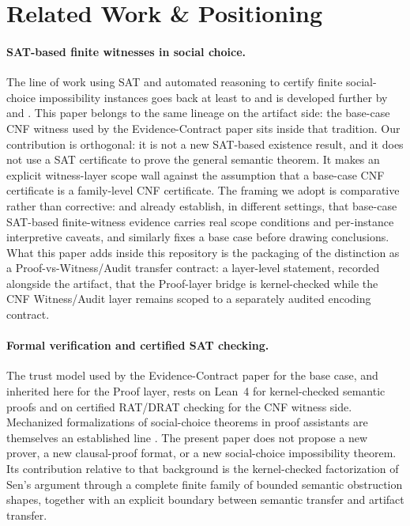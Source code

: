 \section{Related Work \& Positioning}
\label{sec:related}

\paragraph{SAT-based finite witnesses in social choice.}
The line of work using SAT and automated reasoning to certify finite social-choice impossibility instances goes back at least to \citet{tanglin2009computer} and is developed further by \citet{geist2011automated} and \citet{brandtgeist2016strategyproof}.
This paper belongs to the same lineage on the artifact side: the base-case CNF witness used by the Evidence-Contract paper sits inside that tradition.
Our contribution is orthogonal: it is not a new SAT-based existence result, and it does not use a SAT certificate to prove the general semantic theorem.
It makes an explicit witness-layer scope wall against the assumption that a base-case CNF certificate is a family-level CNF certificate.
The framing we adopt is comparative rather than corrective: \citet{tanglin2009computer} and \citet{geist2011automated} already establish, in different settings, that base-case SAT-based finite-witness evidence carries real scope conditions and per-instance interpretive caveats, and \citet{brandtgeist2016strategyproof} similarly fixes a base case before drawing conclusions.
What this paper adds inside this repository is the packaging of the distinction as a Proof-vs-Witness/Audit transfer contract: a layer-level statement, recorded alongside the artifact, that the Proof-layer bridge is kernel-checked while the CNF Witness/Audit layer remains scoped to a separately audited encoding contract.

\paragraph{Formal verification and certified SAT checking.}
The trust model used by the Evidence-Contract paper for the base case, and inherited here for the Proof layer, rests on Lean~4 \citep{moura2021lean4} for kernel-checked semantic proofs and on certified RAT/DRAT checking \citep{cruzfilipe2017lrat,wetzler2014drat} for the CNF witness side.
Mechanized formalizations of social-choice theorems in proof assistants are themselves an established line \citep{nipkow2009social}.
The present paper does not propose a new prover, a new clausal-proof format, or a new social-choice impossibility theorem.
Its contribution relative to that background is the kernel-checked factorization of Sen's argument through a complete finite family of bounded semantic obstruction shapes, together with an explicit boundary between semantic transfer and artifact transfer.


